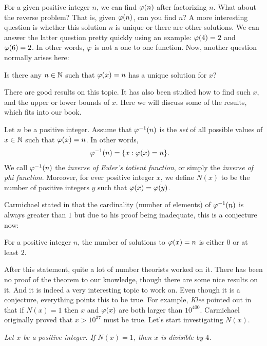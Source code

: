 \documentclass{subfile}
\begin{document}
	For a given positive integer $n$, we can find $\varphi(n)$ after factorizing $n$. What about the reverse problem? That is, given $\varphi(n)$, can you find $n$? A more interesting question is whether this solution $n$ is unique or there are other solutions. We can answer the latter question pretty quickly using an example: $\varphi(4)=2$ and $\varphi (6)=2$. In other words, $\varphi $ is not a one to one function. Now, another question normally arises here:
		\begin{problem}
			Is there any $n\in\mathbb{N}$ such that $\varphi (x)=n$ has a unique solution for $x$?
		\end{problem}
	There are good results on this topic. It has also been studied how to find such $x$, and the upper or lower bounds of $x$. Here we will discuss some of the results, which fits into our book.
		\begin{definition}
			Let $n$ be a positive integer. Assume that $\varphi ^{-1}(n)$ is the \textit{set} of all possible values of $x\in\mathbb{N} $ such that $\varphi (x)=n$. In other words,
				\begin{align*}
					\varphi ^{-1}(n) & = \{x:\varphi (x)=n\}.
				\end{align*}
			We call $\varphi ^{-1}(n)$ the \textit{inverse of Euler's totient function}, or simply the \textit{inverse of phi function}. Moreover, for ever positive integer $x$, we define $N(x)$ to be the number of positive integers $y$ such that $\varphi (x)=\varphi (y)$.
		\end{definition}
	
	Carmichael stated in \cite{carmichael} that the cardinality (number of elements) of $\varphi ^{-1}(n)$ is always greater than $1$ but due to his proof being inadequate, this is a conjecture now:
		\begin{conjecture}
			For a positive integer $n$, the number of solutions to $\varphi (x)=n$ is either $0$ or at least $2$.
		\end{conjecture}
	After this statement, quite a lot of number theorists worked on it. There has been no proof of the theorem to our knowledge, though there are some nice results on it. And it is indeed a very interesting topic to work on. Even though it is a conjecture, everything points this to be true. For example, \textit{Klee} pointed out in \cite{klee} that if $N(x)=1$ then $x$ and $\varphi (x)$ are both larger than $10^{400}$. Carmichael originally proved that $x>10^{37}$ must be true. Let's start investigating $N(x)$.
		\begin{theorem}\slshape
			Let $x$ be a positive integer. If $N(x)=1$, then $x$ is divisible by $4$.
		\end{theorem}
		
\end{document}
